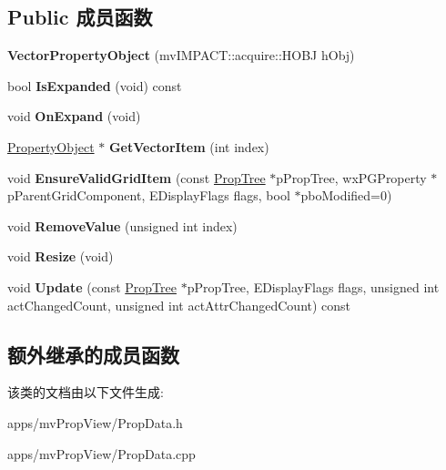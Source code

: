 \subsection*{Public 成员函数}
\begin{DoxyCompactItemize}
\item 
\hypertarget{class_vector_property_object_a3a572012da14c15576400c16a622b7d1}{{\bfseries Vector\+Property\+Object} (mv\+I\+M\+P\+A\+C\+T\+::acquire\+::\+H\+O\+B\+J h\+Obj)}\label{class_vector_property_object_a3a572012da14c15576400c16a622b7d1}

\item 
\hypertarget{class_vector_property_object_a3881125ebb86280f0a954fcec433a633}{bool {\bfseries Is\+Expanded} (void) const }\label{class_vector_property_object_a3881125ebb86280f0a954fcec433a633}

\item 
\hypertarget{class_vector_property_object_a7956d686b370f533e315ad2b05952dec}{void {\bfseries On\+Expand} (void)}\label{class_vector_property_object_a7956d686b370f533e315ad2b05952dec}

\item 
\hypertarget{class_vector_property_object_ad3cfc2a863be9c3a419fe44ded48b023}{\hyperlink{class_property_object}{Property\+Object} $\ast$ {\bfseries Get\+Vector\+Item} (int index)}\label{class_vector_property_object_ad3cfc2a863be9c3a419fe44ded48b023}

\item 
\hypertarget{class_vector_property_object_a73fc3a3c2951c5a08b3b89bc8ad04229}{void {\bfseries Ensure\+Valid\+Grid\+Item} (const \hyperlink{class_prop_tree}{Prop\+Tree} $\ast$p\+Prop\+Tree, wx\+P\+G\+Property $\ast$p\+Parent\+Grid\+Component, E\+Display\+Flags flags, bool $\ast$pbo\+Modified=0)}\label{class_vector_property_object_a73fc3a3c2951c5a08b3b89bc8ad04229}

\item 
\hypertarget{class_vector_property_object_a0d93c40dc0c5e5bf822949aa6acda822}{void {\bfseries Remove\+Value} (unsigned int index)}\label{class_vector_property_object_a0d93c40dc0c5e5bf822949aa6acda822}

\item 
\hypertarget{class_vector_property_object_a8571b44d21b04364d6165fac6c0c9fde}{void {\bfseries Resize} (void)}\label{class_vector_property_object_a8571b44d21b04364d6165fac6c0c9fde}

\item 
\hypertarget{class_vector_property_object_a098e1944a0d6514a0b8a2239cdd844aa}{void {\bfseries Update} (const \hyperlink{class_prop_tree}{Prop\+Tree} $\ast$p\+Prop\+Tree, E\+Display\+Flags flags, unsigned int act\+Changed\+Count, unsigned int act\+Attr\+Changed\+Count) const }\label{class_vector_property_object_a098e1944a0d6514a0b8a2239cdd844aa}

\end{DoxyCompactItemize}
\subsection*{额外继承的成员函数}


该类的文档由以下文件生成\+:\begin{DoxyCompactItemize}
\item 
apps/mv\+Prop\+View/Prop\+Data.\+h\item 
apps/mv\+Prop\+View/Prop\+Data.\+cpp\end{DoxyCompactItemize}
